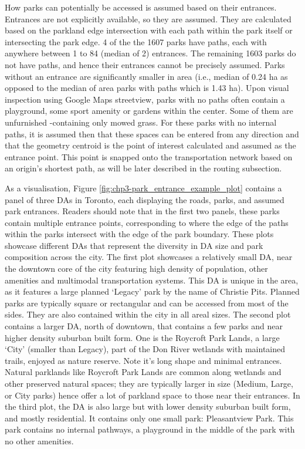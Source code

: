 \documentclass[
11pt, %
oneside, %
english, %
singlespacing, %
]{macthesis} %
\begin{document}
How parks can potentially be accessed is assumed based on their entrances. Entrances are not explicitly available, so they are assumed. They are calculated based on the parkland edge intersection with each path within the park itself or intersecting the park edge. 4 of the the 1607 parks have paths, each with anywhere between 1 to 84 (median of 2) entrances. The remaining 1603 parks do not have paths, and hence their entrances cannot be precisely assumed. Parks without an entrance are significantly smaller in area (i.e., median of 0.24 ha as opposed to the median of area parks with paths which is 1.43 ha). Upon visual inspection using Google Maps streetview, parks with no paths often contain a playground, some sport amenity or gardens within the center. Some of them are unfurnished -containing only mowed grass. For these parks with no internal paths, it is assumed then that these spaces can be entered from any direction and that the geometry centroid is the point of interest calculated and assumed as the entrance point. This point is snapped onto the transportation network based on an origin's shortest path, as will be later described in the routing subsection.

As a visualisation, Figure \ref{fig:chp3-park_entrance_example_plot} contains a panel of three DAs in Toronto, each displaying the roads, parks, and assumed park entrances. Readers should note that in the first two panels, these parks contain multiple entrance points, corresponding to where the edge of the paths within the parks intersect with the edge of the park boundary. These plots showcase different DAs that represent the diversity in DA size and park composition across the city. The first plot showcases a relatively small DA, near the downtown core of the city featuring high density of population, other amenities and multimodal transportation systems. This DA is unique in the area, as it features a large planned `Legacy' park by the name of Christie Pits. Planned parks are typically square or rectangular and can be accessed from most of the sides. They are also contained within the city in all areal sizes. The second plot contains a larger DA, north of downtown, that contains a few parks and near higher density suburban built form. One is the Roycroft Park Lands, a large `City' (smaller than Legacy), part of the Don River wetlands with maintained trails, enjoyed as nature reserve. Note it's long shape and minimal entrances. Natural parklands like Roycroft Park Lands are common along wetlands and other preserved natural spaces; they are typically larger in size (Medium, Large, or City parks) hence offer a lot of parkland space to those near their entrances. In the third plot, the DA is also large but with lower density suburban built form, and mostly residential. It contains only one small park: Pleasantview Park. This park contains no internal pathways, a playground in the middle of the park with no other amenities.
\end{document}
